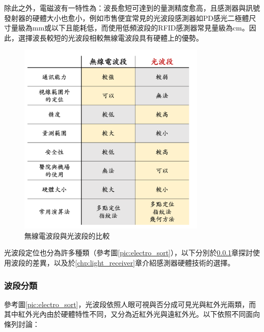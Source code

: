             除此之外，電磁波有一特性為：波長愈短可達到的量測精度愈高，且感測器與訊號發射器的硬體大小也愈小，例如市售便宜常見的光波段感測器如PD感光二極體尺寸量級為mm或以下\cite{datasheet:led_sfh4545}且能耗低，而使用低頻波段的RFID感測器常見量級為cm\cite{datasheet:rfid_tag}。因此，選擇波長較短的光波段相較無線電波段具有硬體上的優勢。

            \begin{figure}[htpb]
                \centering
                \includegraphics[width=9cm]{ch2pic/method_compare.png}
                \caption{無線電波段與光波段的比較}
                \label{pic:method_compare}
            \end{figure}


            光波段定位也分為許多種類（參考圖\ref{pic:electro_sort}），以下分別於\ref{chp:light_electro}章探討使用波段的差異，以及於\ref{chp:light_receiver}章介紹感測器硬體技術的選擇。


            \subsubsection{波段分類}

            \label{chp:light_electro}

            參考圖\ref{pic:electro_sort}，光波段依照人眼可視與否分成可見光與紅外光兩類，而其中紅外光內由於硬體特性不同，又分為近紅外光與遠紅外光。以下依照不同面向條列討論：

